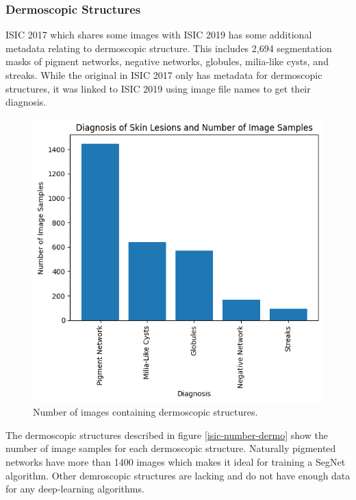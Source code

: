 \subsubsection{Dermoscopic Structures}

ISIC 2017 which shares some images with ISIC 2019 has some additional metadata relating to dermoscopic structure. This includes 2,694 segmentation masks of pigment networks, negative networks, globules, milia-like cysts, and streaks. While the original in ISIC 2017 only has metadata for dermoscopic structures, it was linked to ISIC 2019 using image file names to get their diagnosis.

\begin{figure}
	\centering
	\includegraphics[scale=0.8]{images/ISIC/isic-dermo-number.png}
	\caption{Number of images containing dermoscopic structures.} 
\end{figure} \label{isic-number-dermo}

The dermoscopic structures described in figure \ref{isic-number-dermo} show the number of image samples for each dermoscopic structure. Naturally pigmented networks have more than 1400 images which makes it ideal for training a SegNet algorithm. Other demroscopic structures are lacking and do not have enough data for any deep-learning algorithms.


